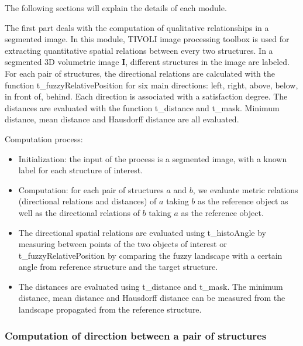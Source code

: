 \documentclass{article}
\begin{document}
The following sections will explain the details of each module.


The first part deals with the computation of qualitative relationships in a segmented image. 
In this module, TIVOLI image processing toolbox is used for extracting quantitative spatial relations between every two structures.
In a segmented 3D volumetric image $\mathbf{I}$, different structures in the image are labeled.
For each pair of structures, the directional relations are calculated with the function t\_fuzzyRelativePosition for six main directions: left, right, above, below, in front of, behind.
Each direction is associated with a satisfaction degree.
The distances are evaluated with the function t\_distance and t\_mask. Minimum distance, mean distance and Hausdorff distance are all evaluated. 

Computation process:
\begin{itemize}
 \item Initialization: the input of the process is a segmented image, with a known label for each structure of interest.
 \item Computation: for each pair of structures $a$ and $b$, we evaluate metric relations (directional relations and distances) of $a$ taking $b$ as the reference object 
 as well as the directional relations of  $b$ taking $a$ as the reference object. 
 \item The directional spatial relations are evaluated using t\_histoAngle by measuring between points of the two objects of interest or 
 t\_fuzzyRelativePosition by comparing the fuzzy landscape with a certain angle from reference structure and the target structure.
 \item The distances are evaluated using t\_distance and t\_mask. The minimum distance, mean distance and Hausdorff distance can be measured from the landscape propagated from the reference structure.
\end{itemize}

\subsubsection{Computation of direction between a pair of structures}
\end{document}
